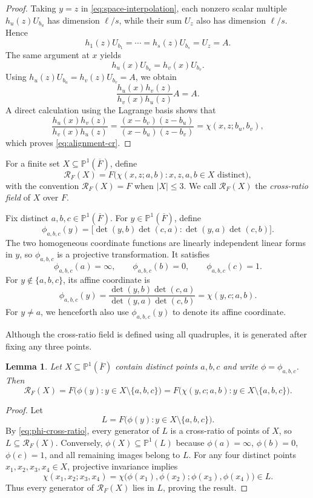 \documentclass[11pt,onecolumn]{IEEEtran}
\newtheorem{lemma}{Lemma}
\newcommand{\crf}{\mathscr R}
\newcommand{\Pone}{\mathbb P^1}
\begin{document}
\begin{proof}
Taking $y=z$ in \eqref{eq:space-interpolation}, each nonzero scalar
multiple $h_u(z)U_{b_u}$ has dimension $\ell/s$, while their sum
$U_{z}$ also has dimension $\ell/s$.  Hence
\[
h_1(z)U_{b_1}=\cdots=h_s(z)U_{b_s}=U_{z}=A.
\]
The same argument at $x$ yields
\[
h_u(x)U_{b_u}=h_v(x)U_{b_v}.
\]
Using $h_u(z)U_{b_u}=h_v(z)U_{b_v}=A$, we obtain
\[
\frac{h_u(x)h_v(z)}{h_v(x)h_u(z)}A=A.
\]
A direct calculation using the Lagrange basis shows that
\[
\frac{h_u(x)h_v(z)}{h_v(x)h_u(z)}
=
\frac{(x-b_v)(z-b_u)}{(x-b_u)(z-b_v)}
=
\chi(x,z;b_u,b_v),
\]
which proves \eqref{eq:alignment-cr}.
\end{proof}

For a finite set $X\subseteq\Pone(\overline F)$, define
\[
\crf_F(X)
=
F\bigl(
\chi(x,z;a,b):x,z,a,b\in X\text{ distinct}
\bigr),
\]
with the convention $\crf_F(X)=F$ when $|X|\le3$.  We call $\crf_F(X)$ the
\emph{cross-ratio field} of $X$ over $F$.

Fix distinct $a,b,c\in\Pone(\overline F)$. For $y\in\Pone(\overline F)$, define
\[
\phi_{a,b,c}(y)
=
\bigl[
\det(y,b)\det(c,a):
\det(y,a)\det(c,b)
\bigr].
\]
The two homogeneous coordinate functions are linearly independent linear forms in $y$, so
$\phi_{a,b,c}$ is a projective transformation.  It satisfies
\[
\phi_{a,b,c}(a)=\infty,
\qquad
\phi_{a,b,c}(b)=0,
\qquad
\phi_{a,b,c}(c)=1.
\]
For $y\notin\{a,b,c\}$, its affine coordinate is
\begin{equation}
\phi_{a,b,c}(y)
=
\frac{\det(y,b)\det(c,a)}
     {\det(y,a)\det(c,b)}
=
\chi(y,c;a,b).
\label{eq:phi-cross-ratio}
\end{equation}
For $y\ne a$, we henceforth also use $\phi_{a,b,c}(y)$ to denote
its affine coordinate.

Although the cross-ratio field is defined using all quadruples, it is
generated after fixing any three points.

\begin{lemma}
\label{lem:three-anchor}
Let $X\subseteq\Pone(\overline F)$ contain distinct points $a,b,c$ and
write $\phi=\phi_{a,b,c}$. Then
\[
\crf_F(X)
=
F\bigl(\phi(y):y\in X\setminus\{a,b,c\}\bigr)
=
F\bigl(\chi(y,c;a,b):y\in X\setminus\{a,b,c\}\bigr).
\]
\end{lemma}

\begin{proof}
Let
\[
L=F\bigl(\phi(y):y\in X\setminus\{a,b,c\}\bigr).
\]
By \eqref{eq:phi-cross-ratio}, every generator of $L$ is a cross-ratio
of points of $X$, so $L\subseteq\crf_F(X)$.  Conversely,
$\phi(X)\subseteq\Pone(L)$ because
$\phi(a)=\infty$, $\phi(b)=0$, $\phi(c)=1$, and all remaining images
belong to $L$.  For any four distinct points $x_1,x_2,x_3,x_4\in X$,
projective invariance implies
\[
\chi(x_1,x_2;x_3,x_4)
=
\chi\bigl(\phi(x_1),\phi(x_2);\phi(x_3),\phi(x_4)\bigr)\in L.
\]
Thus every generator of $\crf_F(X)$ lies in $L$, proving the result.
\end{proof}
\end{document}
